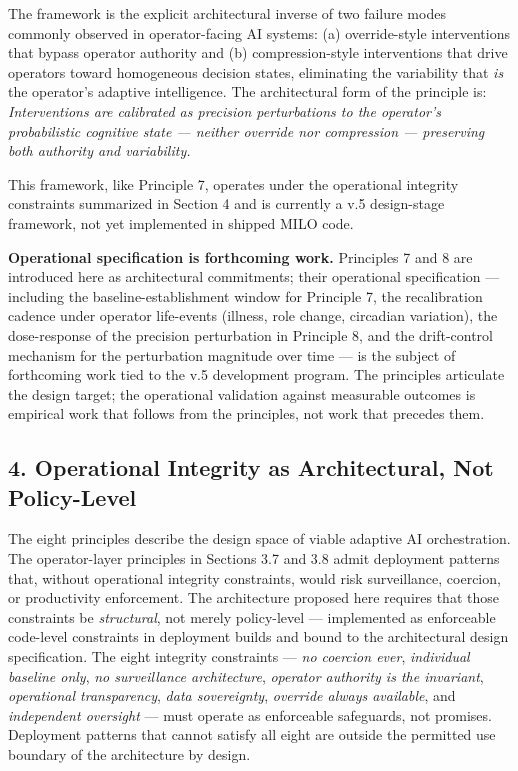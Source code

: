 The framework is the explicit architectural inverse of two failure modes
commonly observed in operator-facing AI systems: (a) override-style
interventions that bypass operator authority and (b) compression-style
interventions that drive operators toward homogeneous decision states,
eliminating the variability that \emph{is} the operator's adaptive
intelligence. The architectural form of the principle is:
\emph{Interventions are calibrated as precision perturbations to the
operator's probabilistic cognitive state --- neither override nor
compression --- preserving both authority and variability.}

This framework, like Principle 7, operates under the operational
integrity constraints summarized in Section 4 and is currently a v.5
design-stage framework, not yet implemented in shipped MILO code.

\textbf{Operational specification is forthcoming work.} Principles 7 and
8 are introduced here as architectural commitments; their operational
specification --- including the baseline-establishment window for
Principle 7, the recalibration cadence under operator life-events
(illness, role change, circadian variation), the dose-response of the
precision perturbation in Principle 8, and the drift-control mechanism
for the perturbation magnitude over time --- is the subject of
forthcoming work tied to the v.5 development program. The principles
articulate the design target; the operational validation against
measurable outcomes is empirical work that follows from the principles,
not work that precedes them.

\subsection{4. Operational Integrity as Architectural, Not
Policy-Level}\label{operational-integrity-as-architectural-not-policy-level}

The eight principles describe the design space of viable adaptive AI
orchestration. The operator-layer principles in Sections 3.7 and 3.8
admit deployment patterns that, without operational integrity
constraints, would risk surveillance, coercion, or productivity
enforcement. The architecture proposed here requires that those
constraints be \emph{structural}, not merely policy-level ---
implemented as enforceable code-level constraints in deployment builds
and bound to the architectural design specification. The eight integrity
constraints --- \emph{no coercion ever}, \emph{individual baseline
only}, \emph{no surveillance architecture}, \emph{operator authority is
the invariant}, \emph{operational transparency}, \emph{data
sovereignty}, \emph{override always available}, and \emph{independent
oversight} --- must operate as enforceable safeguards, not promises.
Deployment patterns that cannot satisfy all eight are outside the
permitted use boundary of the architecture by design.

